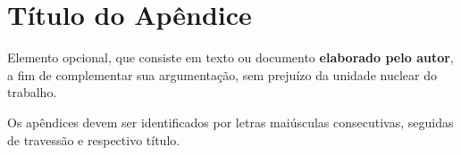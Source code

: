 \chapter{Título do Apêndice}

Elemento opcional, que consiste em texto ou documento \textbf{elaborado pelo autor}, a fim de complementar sua argumentação, sem prejuízo da unidade nuclear do trabalho.

Os apêndices devem ser identificados por letras maiúsculas consecutivas, seguidas de travessão e respectivo título.